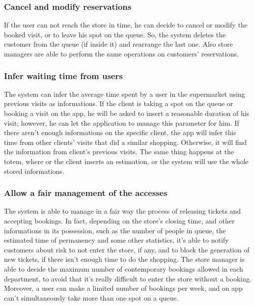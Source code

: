 \documentclass{article}
\begin{document}
		\subsubsection{Cancel and modify reservations}
		
		If the user can not reach the store in time, he can decide to cancel or modify the booked visit, or to leave his spot on the queue. So, the system deletes the customer from the queue (if inside it) and rearrange the last one. Also store managers are able to perform the same operations on customers' reservations. 
		
		
		\subsubsection{Infer waiting time from users}
		
		The system can infer the average time spent by a user in the supermarket using previous visits as informations. If the client is taking a spot on the queue or booking a visit on the app, he will be asked to insert a reasonable duration of his visit; however, he can let the application to manage this parameter for him. If there aren't enough informations on the specific client, the app will infer this time from other clients' visits that did a similar shopping. Otherwise, it will find the information from client's previous visits. The same thing happens at the totem, where or the client inserts an estimation, or the system will use the whole stored informations.
		
		\subsubsection{Allow a fair management of the accesses}
		The system is able to manage in a fair way the process of releasing tickets and accepting bookings. In fact, depending on the store's closing time, and other informations in its possession, such as the number of people in queue, the estimated time of permanency and some other statistics, it's able to notify customers about risk to not enter the store, if any, and to block the generation of new tickets, if there isn't enough time to do the shopping. The store manager is able to decide the maximum number of contemporary bookings allowed in each department, to avoid that it's really difficult to enter the store without a booking. Moreover, a user can make a limited number of bookings per week, and on app can't simultaneously take more than one spot on a queue. \\
		
\end{document}
